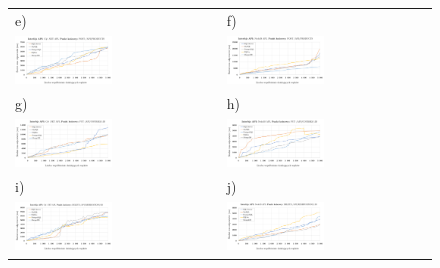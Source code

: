 \begin{figure}[H]
\begin{tabular}{@{}ll@{}}
    e) & f) \\
    \includegraphics[width=0.49\textwidth]{rys05/response-dotnet-addProduct.pdf} & \includegraphics[width=0.49\textwidth]{rys05/response-nodejs-addProduct.pdf} \\
    g) & h) \\
    \includegraphics[width=0.49\textwidth]{rys05/response-dotnet-updateCourse.pdf} & \includegraphics[width=0.49\textwidth]{rys05/response-nodejs-updateCourse.pdf} \\
    i) & j) \\
    \includegraphics[width=0.49\textwidth]{rys05/response-dotnet-deleteReservation.pdf} & \includegraphics[width=0.49\textwidth]{rys05/response-nodejs-deleteReservation.pdf} \\

\end{tabular}
\end{figure}
